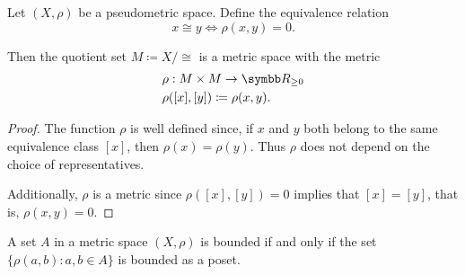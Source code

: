 \begin{proposition}\label{thm:pseudometric_to_metric}
  Let \( (X, \rho) \) be a pseudometric space. Define the equivalence relation
  \begin{equation*}
    x \cong y \iff \rho(x, y) = 0.
  \end{equation*}

  Then the quotient set \( M \coloneqq X / \cong \) is a metric space with the metric
  \begin{align*}
    &\rho: M \times M \to \R_{\geq 0} \\
    &\rho([x], [y]) \coloneqq \rho(x, y).
  \end{align*}
\end{proposition}
\begin{proof}
  The function \( \rho \) is well defined since, if \( x \) and \( y \) both belong to the same equivalence class \( [x] \), then \( \rho(x) = \rho(y) \). Thus \( \rho \) does not depend on the choice of representatives.

  Additionally, \( \rho \) is a metric since \( \rho([x], [y]) = 0 \) implies that \( [x] = [y] \), that is, \( \rho(x, y) = 0 \).
\end{proof}

\begin{proposition}\label{remark:bounded_set_metric_order_equivalence}
  A set \( A \) in a metric space \( (X, \rho) \) is bounded if and only if the set \( \{ \rho(a, b) \colon a, b \in A \} \) is bounded as a poset.
\end{proposition}

